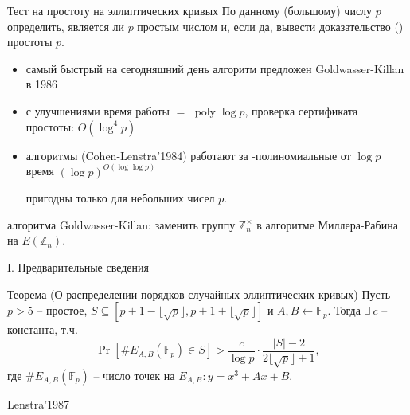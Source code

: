 \documentclass{beamer}
\begin{document}
\begin{frame}{Тест на простоту на эллиптических кривых}
 По данному (большому) числу $p$ определить, является ли $p$ простым числом и, если да, вывести доказательство () простоты $p$.

\begin{itemize}
    \item самый быстрый на сегодняшний день  алгоритм предложен Goldwasser-Killan в 1986
    \item с улучшениями время работы $=$ $\operatorname{poly}\log p$, проверка сертификата простоты: $O(\log^4 p)$
\end{itemize}
\end{frame}

\begin{frame}
\begin{itemize}
\item {} алгоритмы (Cohen-Lenstra'1984) работают за -полиномиальные от $\log p$ время $(\log p)^{O(\log\log p)}$

\structure{$\implies$} пригодны только для небольших чисел $p$.
\end{itemize}

 алгоритма Goldwasser-Killan: заменить группу $\mathbb{Z}_n^\times$ в алгоритме Миллера-Рабина на $E(\mathbb{Z}_n)$.
\end{frame}

\begin{frame}{I. Предварительные сведения}
    \begin{block}{Теорема (О распределении порядков случайных эллиптических кривых)}
        Пусть $p>5$ -- простое, $S \subseteq [ p+1-\lfloor\sqrt{p}\rfloor, p+1+\lfloor\sqrt{p}\rfloor ]$ и $A, B \leftarrow \mathbb{F}_p$. Тогда $\exists\ c$ -- константа, т.ч.
        \[
        \Pr\left[\#E_{A,B}(\mathbb{F}_p) \in S \right] > \frac{c}{\log p} \cdot \frac{|S|-2}{2\lfloor\sqrt{p}\rfloor + 1},
        \]
        где $\#E_{A,B}(\mathbb{F}_p)$ -- число точек на $E_{A,B}: y = x^3 + Ax+B$.
    \end{block}
    \structure{$\triangleleft$}  Lenstra'1987 \structure{$\triangleright$}
\end{frame}
\end{document}
